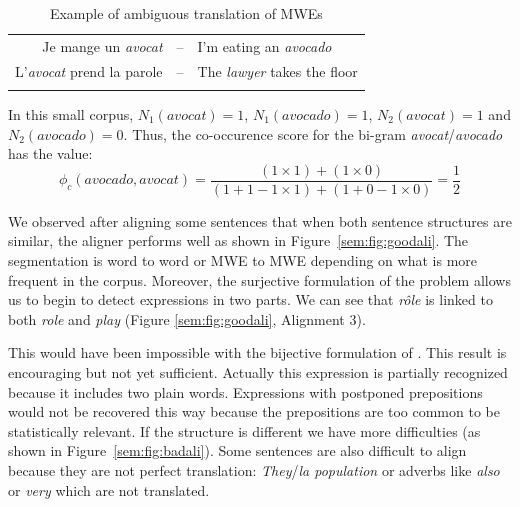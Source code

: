 \documentclass[output=paper,modfonts,nonflat]{langsci/langscibook}
\begin{document}
\begin{table}[h!]
\begin{tabular}{rcl}
  \lsptoprule
Je mange un \emph{avocat} & -- & I'm eating an \emph{avocado} \\
L'\emph{avocat} prend la parole & -- & The \emph{lawyer} takes the floor \\
  \lspbottomrule
\end{tabular}
\caption{\label{sem:tab:probtrans} Example of ambiguous translation of MWEs}
\end{table}

In this small corpus, $N_1(\mathit{avocat}) = 1$, $N_1(\mathit{avocado}) = 1$, $N_2(\mathit{avocat}) = 1$ and $N_2(\mathit{avocado}) = 0$. Thus, the co-occurence score for the bi-gram \textit{avocat}\slash \textit{avocado} has the value:
\begin{equation}
\phi_{c}(\mathit{avocado},\mathit{avocat}) = \frac{(1 \times 1) + (1 \times 0)}{(1 + 1 -1 \times 1) + (1 + 0 - 1 \times 0)} = \frac{1}{2}
\end{equation}

We observed after aligning some sentences that when both sentence structures are similar, the aligner performs well as shown in Figure~\ref{sem:fig:goodali}. The segmentation is word to word or MWE to MWE depending on what is more frequent in the corpus. Moreover, the surjective formulation of the problem allows us to begin to detect expressions in two parts. 
We can see that \textit{rôle} is linked to both \textit{role} and \textit{play} (Figure \ref{sem:fig:goodali}, Alignment 3).

This would have been impossible with the bijective formulation of \citet{denero2008complexity}. This result is encouraging but not yet sufficient. 
Actually this expression is partially recognized because it includes two plain words. 
Expressions with postponed prepositions would not be recovered this way because the prepositions are too common to be statistically relevant.
If the structure is different we have more difficulties (as shown in Figure~\ref{sem:fig:badali}). 
Some sentences are also difficult to align because they are not perfect translation: 
\textit{They}\slash\textit{la population} or adverbs like \textit{also} or \textit{very} which are not translated.
\end{document}
